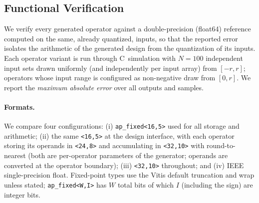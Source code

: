 \subsection{Functional Verification}
\label{sec:verification}

We verify every generated operator against a double-precision (float64) reference computed on the same, already quantized, inputs, so that
the reported error isolates the arithmetic of the generated design from the quantization of its inputs. Each operator variant is run through
C~simulation with $N{=}100$ independent input sets drawn uniformly (and independently per input array) from $[-r,r]$; operators whose input
range is configured as non-negative draw from $[0,r]$. We report the \emph{maximum absolute error} over all outputs and samples.

\paragraph{Formats.} We compare four configurations: (i) \texttt{ap\_fixed<16,5>} used for all storage and arithmetic; (ii) the same
\texttt{<16,5>} at the design interface, with each operator storing its operands in \texttt{<24,8>} and accumulating in \texttt{<32,10>}
with round-to-nearest (both are per-operator parameters of the generator; operands are converted at the operator boundary);
(iii) \texttt{<32,10>} throughout; and (iv) IEEE single-precision float. Fixed-point types use the Vitis default truncation and wrap unless
stated; \texttt{ap\_fixed<W,I>} has $W$ total bits of which $I$ (including the sign) are integer bits.

